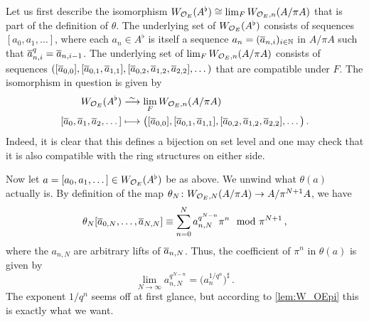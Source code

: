 \begin{proof*}
	Let us first describe the isomorphism $W_{\mathcal{O}_E}(A^\flat)\cong \lim_FW_{\mathcal{O}_E,n}(A/\pi A)$ that is part of the definition of $\theta$. The underlying set of $W_{\mathcal{O}_E}(A^\flat)$ consists of sequences $[a_0,a_1,\dotsc]$, where each $a_n\in A^\flat$ is itself a sequence $a_n=(\ov{a}_{n,i})_{i\in\IN}$ in $A/\pi A$ such that $\ov{a}_{n,i}^q=\ov{a}_{n,i-1}$. The underlying set of $\lim_FW_{\mathcal{O}_E,n}(A/\pi A)$ consists of sequences $([\ov{a}_{0,0}],[\ov{a}_{0,1},\ov{a}_{1,1}],[\ov{a}_{0,2},\ov{a}_{1,2},\ov{a}_{2,2}],\dotsc)$ that are compatible under $F$. The isomorphism in question is given by
	\begin{align*}
		W_{\Oo_E}(A^\flat)&\isomorphism\lim_FW_{\Oo_E,n}(A/\pi A)\\
		[\ov{a}_0,\ov{a}_1,\ov{a}_2,\dotsc]&\longmapsto \big([\ov{a}_{0,0}],[\ov{a}_{0,1},\ov{a}_{1,1}],[\ov{a}_{0,2},\ov{a}_{1,2},\ov{a}_{2,2}],\dotsc\big)\,.
	\end{align*}
	Indeed, it is clear that this defines a bijection on set level and one may check that it is also compatible with the ring structures on either side.
	
	Now let $a=[a_0,a_1,\dotsc]\in W_{\mathcal{O}_E}(A^\flat)$ be as above. We unwind what $\theta(a)$ actually is. By definition of the map $\theta_N\colon W_{\Oo_E,N}(A/\pi A)\morphism A/\pi^{N+1}A$, we have
	\begin{equation*}
		\theta_N[\ov{a}_{0,N},\dotsc,\ov{a}_{N,N}]\equiv\sum_{n=0}^Na_{n,N}^{q^{N-n}}\pi^n\mod \pi^{N+1}\,,
	\end{equation*}
	where the $a_{n,N}$ are arbitrary lifts of $\ov{a}_{n,N}$. 
	Thus, the coefficient of $\pi^n$ in $\theta(a)$ is given by
	\begin{equation*}
		\lim_{N\to\infty}a_{n,N}^{q^{N-n}}=\big(a_n^{1/q^n}\big)^\sharp\,.
	\end{equation*}
	The exponent $1/q^n$ seems off at first glance, but according to \cref{lem:W_OEpi} this is exactly what we want.
\end{proof*}
